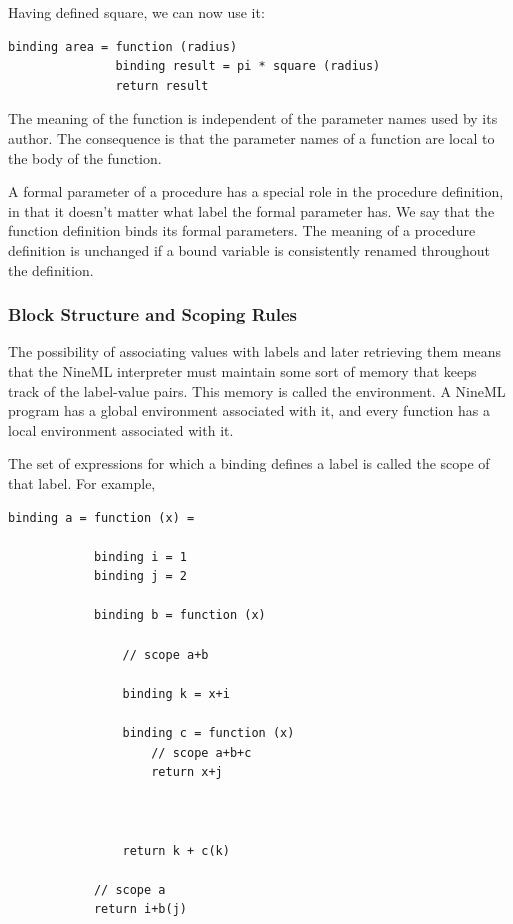 \documentclass[a4paper]{article}
\begin{document}
Having defined square, we can now use it:

\begin{lstlisting}[style=display]
binding area = function (radius)
               binding result = pi * square (radius)
               return result
\end{lstlisting}

The meaning of the function is independent of the parameter names
used by its author. The consequence is that the parameter names of a
function are local to the body of the function.

A formal parameter of a procedure has a special role in the
procedure definition, in that it doesn't matter what label the formal
parameter has. We say that the function definition binds its formal
parameters. The meaning of a procedure definition is unchanged if a
bound variable is consistently renamed throughout the definition.
  
\subsubsection{Block Structure and Scoping Rules}

The possibility of associating values with labels and later
retrieving them means that the NineML interpreter must maintain some
sort of memory that keeps track of the label-value pairs. This memory
is called the environment. A NineML program has a global environment
associated with it, and every function has a local
environment associated with it.

The set of expressions for which a binding defines a label is called
the scope of that label.  For example,

\begin{lstlisting}[style=display]
binding a = function (x) =

            binding i = 1
            binding j = 2

            binding b = function (x)

                // scope a+b

                binding k = x+i

                binding c = function (x)
                    // scope a+b+c
                    return x+j

 

                return k + c(k)

            // scope a
            return i+b(j)

\end{lstlisting}
 
\end{document}
